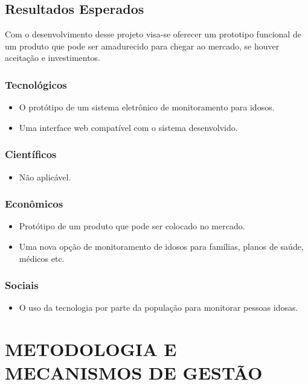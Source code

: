\documentclass[a4paper]{article}
\begin{document}
\subsection{Resultados Esperados}
Com o desenvolvimento desse projeto visa-se oferecer um prototipo funcional de um produto que pode ser amadurecido para chegar ao mercado, se houver aceitação e investimentos. 

\subsubsection{Tecnológicos}
\begin{itemize}
\item O protótipo de um sistema eletrônico de monitoramento para idosos.
\item Uma interface web compatível com o sistema desenvolvido.
\end{itemize}

\subsubsection{Científicos}
\begin{itemize}
\item Não aplicável.
\end{itemize}

\subsubsection{Econômicos}
\begin{itemize}
\item Protótipo de um produto que pode ser colocado no mercado.
\item Uma nova opção de monitoramento de idosos para famílias, planos de saúde, médicos etc.
\end{itemize}

\subsubsection{Sociais}
\begin{itemize}
\item O uso da tecnologia por parte da população para monitorar pessoas idosas.
\end{itemize}

\section{METODOLOGIA E MECANISMOS DE GESTÃO}
\end{document}
